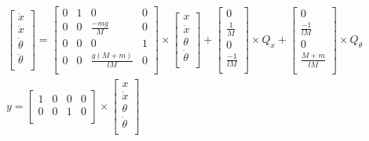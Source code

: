 \begin{equation}
    \begin{array}{cc}
        \begin{bmatrix}
        \dot{x} \\
        \ddot{x} \\
        \dot{\theta} \\
        \ddot{\theta} \\
    \end{bmatrix} = \begin{bmatrix}
        0 & 1 & 0 & 0 \\
        0 & 0 & \frac{-mg}{M} & 0 \\
        0 & 0 & 0 & 1 \\
        0 & 0 & \frac{g(M + m)}{lM} & 0 \\
    \end{bmatrix} \times \begin{bmatrix}
        x \\
        \dot{x} \\
        \theta \\
        \dot{\theta} \\
    \end{bmatrix} + \begin{bmatrix}
        0 \\
        \frac{1}{M} \\
        0 \\
        \frac{-1}{lM} \\
    \end{bmatrix} \times Q_x + \begin{bmatrix}
        0 \\
        \frac{-1}{lM} \\
        0 \\
        \frac{M + m}{lM} \\ 
    \end{bmatrix} \times Q_{\theta}  \\[4em]
    y = \begin{bmatrix}
        1 & 0 & 0 & 0 \\
        0 & 0 & 1 & 0 \\ 
    \end{bmatrix} \times \begin{bmatrix}
        x \\
        \dot{x} \\
        \theta \\
        \dot{\theta} \\
    \end{bmatrix}
    \end{array}
\end{equation}
